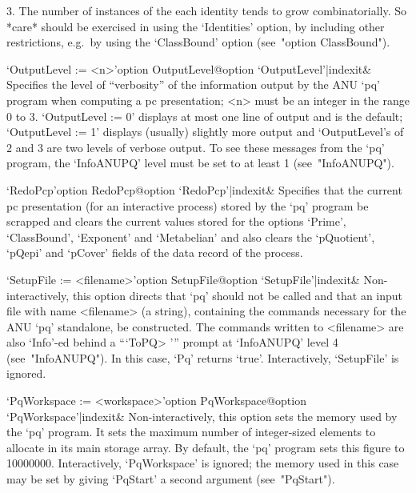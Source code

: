 \item{3.}
The  number  of  instances  of  the   each   identity   tends   to   grow
combinatorially. So *care* should be exercised in using the  `Identities'
option, by including other restrictions, e.g.~by using  the  `ClassBound'
option (see~"option ClassBound").

\endlist

\>`OutputLevel := <n>'{option OutputLevel}@{option `OutputLevel'|indexit}&
Specifies the level of ``verbosity'' of the information output by the ANU
`pq' program when computing a pc presentation; <n> must be an integer  in
the range 0 to 3. `OutputLevel := 0' displays at most one line of  output
and is the default; `OutputLevel := 1' displays (usually)  slightly  more
output and `OutputLevel's of 2 and 3 are two levels of verbose output. To
see these messages from the `pq' program, the `InfoANUPQ' level  must  be
set to at least 1 (see~"InfoANUPQ").

\>`RedoPcp'{option RedoPcp}@{option `RedoPcp'|indexit}&
Specifies that the current pc presentation (for an  interactive  process)
stored by the `pq' program be  scrapped  and  clears  the  current  values
stored for the options `Prime', `ClassBound', `Exponent' and `Metabelian'
and also clears the `pQuotient', `pQepi' and `pCover' fields of the  data
record of the process.

\>`SetupFile := <filename>'{option SetupFile}@{option `SetupFile'|indexit}&
Non-interactively, this option directs that `pq' should not be called and
that an input file  with  name  <filename>  (a  string),  containing  the
commands necessary for the  ANU  `pq'  standalone,  be  constructed.  The
commands written to <filename> are also `Info'-ed behind  a  ```ToPQ> '''
prompt at `InfoANUPQ' level  4  (see~"InfoANUPQ").  In  this  case,  `Pq'
returns `true'. Interactively, `SetupFile' is ignored.

\>`PqWorkspace := <workspace>'{option PqWorkspace}@{option `PqWorkspace'|indexit}&
Non-interactively, this option sets the memory used by the  `pq'  program.
It sets the maximum number of integer-sized elements to allocate  in  its
main storage array. By default, the  `pq'  program  sets  this  figure  to
10000000. Interactively, `PqWorkspace' is ignored;  the  memory  used  in
this  case  may  be  set  by   giving   `PqStart'   a   second   argument
(see~"PqStart").

